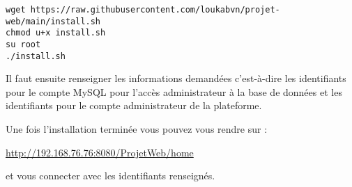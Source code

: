 \begin{verbatim}
wget https://raw.githubusercontent.com/loukabvn/projet-web/main/install.sh
chmod u+x install.sh
su root
./install.sh
\end{verbatim}

Il faut ensuite renseigner les informations demandées c'est-à-dire les identifiants pour le
compte MySQL pour l'accès administrateur à la base de données et les identifiants pour le compte
administrateur de la plateforme.

Une fois l'installation terminée vous pouvez vous rendre sur :
\begin{center}
    \url{http://192.168.76.76:8080/ProjetWeb/home}
\end{center}
et vous connecter avec les identifiants renseignés.
